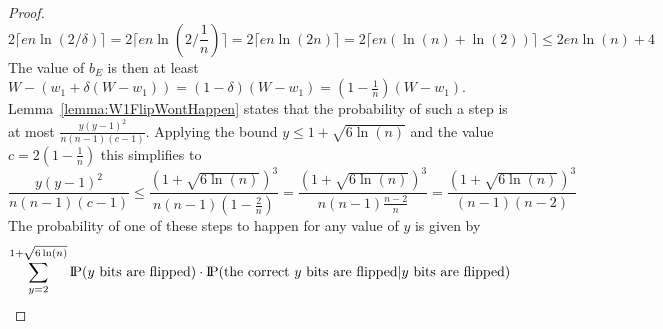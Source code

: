 \begin{proof}
    \[
        2\lceil en\ln(2/\delta)\rceil
        =2\lceil en\ln(2/\frac{1}{n})\rceil
        =2\lceil en\ln(2n)\rceil
        =2\lceil en(\ln(n)+\ln(2))\rceil
        \le 2en\ln(n)+4
    \]
    The value of $b_E$ is then at least \(W-(w_1+\delta(W-w_1))=(1-\delta)(W-w_1)=(1-\frac{1}{n})(W-w_1)\).
    Lemma~\ref{lemma:W1FlipWontHappen} states that the probability of such a step is at most $\frac{y{(y-1)}^2}{n(n-1)(c-1)}$.
    Applying the bound $y\le1+\sqrt{6\ln(n)}$ and the value $c=2(1-\frac{1}{n})$ this simplifies to 
    \[
        \frac{y{(y-1)}^2}{n(n-1)(c-1)}
        \le\frac{{(1+\sqrt{6\ln(n)})}^3}{n(n-1)(1-\frac{2}{n})}
        =\frac{{(1+\sqrt{6\ln(n)})}^3}{n(n-1)\frac{n-2}{n}}
        =\frac{{(1+\sqrt{6\ln(n)})}^3}{(n-1)(n-2)}
    \]
    The probability of one of these steps to happen for any value of $y$ is given by
    \begin{gather}
        \nonumber \sum_{y=2}^{1+\sqrt{6\ln(n)}}{\probP(y \text{ bits are flipped})\cdot\probP(\text{the correct $y$ bits are flipped} | y \text{ bits are flipped})}\\

\end{gather}
\end{proof}

